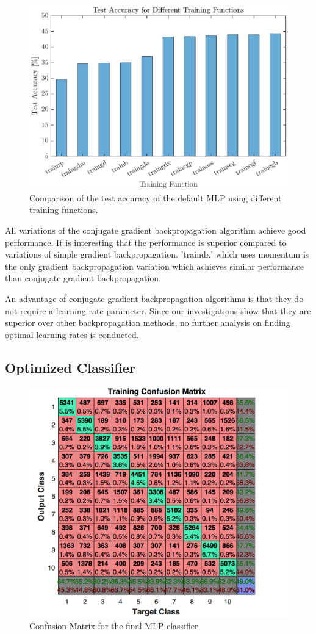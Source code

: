  \begin{figure}[h!]
 	\centering
 	\includegraphics{images/trainingFct}
 	\caption{Comparison of the test accuracy of the default MLP using different training functions.}
 	\label{fig:trainingFct}
 \end{figure}

 All variations of the conjugate gradient backpropagation algorithm\cite{moller1993scaled} achieve good performance. It is interesting that the performance is superior compared to variations of simple gradient backpropagation. 'traindx' which uses momentum is the only gradient backpropagation variation which achieves similar performance than conjugate gradient backpropagation.

 An advantage of conjugate gradient backpropagation algorithms is that they do not require a learning rate parameter. Since our investigations show that they are superior over other backpropagation methods, no further analysis on finding optimal learning rates is conducted.

\subsection{Optimized Classifier}\label{sec:optClassifier}

\begin{figure}[h!]
   \centering
   \includegraphics[width=\textwidth]{images/Confusion_Matrix}
   \caption{Confusion Matrix for the final MLP classifier }
   \label{fig:Conf_Matrix}
\end{figure}